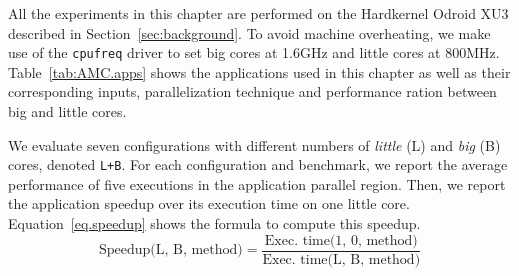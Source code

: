 






All the experiments in this chapter are performed on the Hardkernel Odroid XU3 described in Section~\ref{sec:background}. 
To avoid machine overheating, we make use of the \texttt{cpufreq} driver to set big cores at 1.6GHz and little cores at 800MHz. 
Table~\ref{tab:AMC.apps} shows the applications used in this chapter as well as their corresponding inputs, parallelization technique and performance ration between big and little cores.

We evaluate seven configurations with different numbers of \textit{little} (L) and \textit{big} (B) cores, denoted \texttt{L+B}.
For each configuration and benchmark, we report the average performance of five executions in the application parallel region. Then, we report the application speedup over its execution time on one little core.
Equation~\ref{eq.speedup} shows the formula to compute this speedup.
\begingroup\makeatletter\def\f@size{9}\check@mathfonts
\begin{equation}
  \text{Speedup(L, B, method)} = \frac{\text{Exec. time(1, 0, method)}}{\text{Exec. time(L, B, 
method)}}
\label{eq.speedup}
\end{equation}
\endgroup

